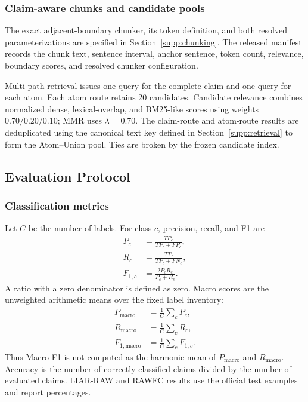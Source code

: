 \subsubsection{Claim-aware chunks and candidate pools}

The exact adjacent-boundary chunker, its token definition, and both resolved
parameterizations are specified in Section~\ref{supp:chunking}.  The released
manifest records the chunk text, sentence interval, anchor sentence, token
count, relevance, boundary scores, and resolved chunker configuration.

Multi-path retrieval issues one query for the complete claim and one query
for each atom.  Each atom route retains 20 candidates.  Candidate relevance
combines normalized dense, lexical-overlap, and BM25-like scores using
weights \(0.70/0.20/0.10\); MMR uses \(\lambda=0.70\).
The claim-route and atom-route results are deduplicated using the canonical
text key defined in Section~\ref{supp:retrieval} to form the Atom--Union
pool.  Ties are broken by the frozen candidate index.

\subsection{Evaluation Protocol}
\label{sec:supp-evaluation}

\subsubsection{Classification metrics}

Let \(C\) be the number of labels.  For class \(c\), precision, recall, and
F1 are
\begin{equation}
\begin{aligned}
P_c&=\frac{TP_c}{TP_c+FP_c},\\
R_c&=\frac{TP_c}{TP_c+FN_c},\\
F_{1,c}&=\frac{2P_cR_c}{P_c+R_c}.
\end{aligned}
\end{equation}
A ratio with a zero denominator is defined as zero.  Macro scores are the
unweighted arithmetic means over the fixed label inventory:
\begin{equation}
\begin{aligned}
P_{\mathrm{macro}}&=\frac{1}{C}\sum_c P_c,\\
R_{\mathrm{macro}}&=\frac{1}{C}\sum_c R_c,\\
F_{1,\mathrm{macro}}&=\frac{1}{C}\sum_c F_{1,c}.
\end{aligned}
\end{equation}
Thus Macro-F1 is not computed as the harmonic mean of
\(P_{\mathrm{macro}}\) and \(R_{\mathrm{macro}}\).
Accuracy is the number of correctly classified claims divided by the
number of evaluated claims.  LIAR-RAW and RAWFC results use the official
test examples and report percentages.

